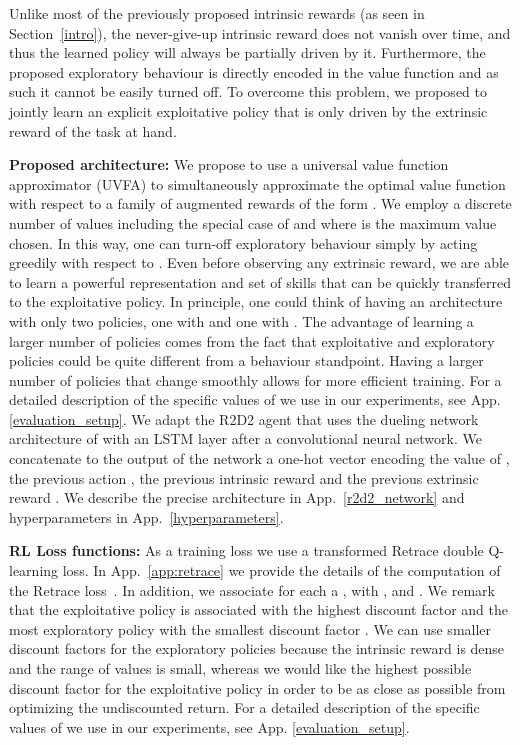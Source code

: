 \documentclass{article} \usepackage{iclr2020_conference,times}
\begin{document}
Unlike most of the previously proposed intrinsic rewards (as seen in Section~\ref{intro}), the never-give-up intrinsic reward does not vanish over time, and thus the learned policy will always be partially driven by it.
Furthermore, the proposed exploratory behaviour is directly encoded in the value function and as such it cannot be easily turned off. 
To overcome this problem, we proposed to jointly learn an explicit exploitative policy that is only driven by the extrinsic reward of the task at hand.


{\bf Proposed architecture:} We propose to use a universal value function approximator (UVFA)  to simultaneously approximate the optimal value function with respect to a family of augmented rewards of the form .
We employ a discrete number  of values  including the special case of  and  where  is the maximum value chosen. In this way, one can turn-off exploratory behaviour simply by acting greedily with respect to .
Even before observing any extrinsic reward, we are able to learn a powerful representation and set of skills that can be quickly transferred to the exploitative policy.
In principle, one could think of having an architecture with only two policies, one with  and one with . The advantage of learning a larger number of policies comes from the fact that exploitative and exploratory policies could be quite different from a behaviour standpoint. Having a larger number of policies that change smoothly allows for more efficient training. For a detailed description of the specific values of  we use in our experiments, see App.\ref{evaluation_setup}. 
We adapt the R2D2 agent that uses the dueling network architecture of \citet{wang2015dueling} with an LSTM layer after a convolutional neural network. We concatenate to the output of the network a one-hot vector encoding the value of , the previous action , the previous intrinsic reward  and the previous extrinsic reward . We describe the precise architecture in App.~\ref{r2d2_network} and hyperparameters in App.~\ref{hyperparameters}.


{\bf RL Loss functions:} As a training loss we use a transformed Retrace double Q-learning loss. In App.~\ref{app:retrace} we provide the details of the computation of the Retrace loss~\citep{munos2016safe}. In addition, we associate for each  a , with , and . We remark that the exploitative policy  is associated with the highest discount factor  and the most exploratory policy  with the smallest discount factor . We can use smaller discount factors for the exploratory policies because the intrinsic reward is dense and the range of values is small, whereas we would like the highest possible discount factor for the exploitative policy in order to be as close as possible from optimizing the undiscounted return. For a detailed description of the specific values of  we use in our experiments, see App. \ref{evaluation_setup}. 
\end{document}

